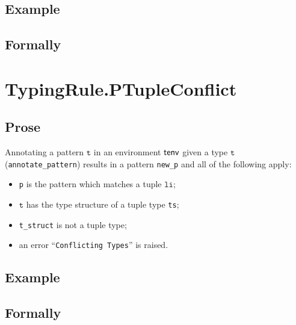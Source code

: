 \documentclass{book}
\newcommand\vt[0]{\texttt{t}}
\newcommand\vli[0]{\texttt{li}}
\begin{document}
  \subsection{Example}



\begin{emptyformal}
    \subsection{Formally}
\end{emptyformal}



\section{TypingRule.PTupleConflict \label{sec:TypingRule.PTupleConflict}}

  \subsection{Prose}
   Annotating a pattern $\vt$ in an environment $\textsf{tenv}$ given a type $\vt$ (\texttt{annotate\_pattern}) results in a pattern \texttt{new\_p} and all of the following apply:
   \begin{itemize}
   \item \texttt{p} is the pattern which matches a tuple $\vli$;
   \item $\vt$ has the type structure of a tuple type \texttt{ts};
   \item \texttt{t\_struct} is not a tuple type;
   \item an error ``\texttt{Conflicting Types}'' is raised.
   \end{itemize}

  \subsection{Example}



\begin{emptyformal}
    \subsection{Formally}
\end{emptyformal}
\end{document}
